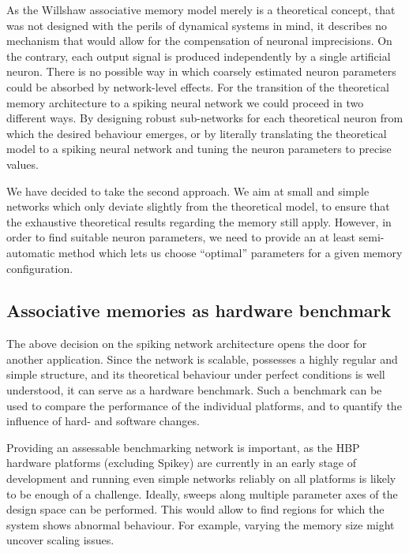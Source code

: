 As the Willshaw associative memory model merely is a theoretical concept, that was not designed with the perils of dynamical systems in mind, it describes no mechanism that would allow for the compensation of neuronal imprecisions. On the contrary, each output signal is produced independently by a single artificial neuron. There is no possible way in which coarsely estimated neuron parameters could be absorbed by network-level effects. For the transition of the theoretical memory architecture to a spiking neural network we could proceed in two different ways. By designing robust sub-networks for each theoretical neuron from which the desired behaviour emerges, or by literally translating the theoretical model to a spiking neural network and tuning the neuron parameters to precise values.

We have decided to take the second approach. We aim at small and simple networks which only deviate slightly from the theoretical model, to ensure that the exhaustive theoretical results regarding the memory still apply. However, in order to find suitable neuron parameters, we need to provide an at least semi-automatic method which lets us choose \enquote{optimal} parameters for a given memory configuration.

\subsection{Associative memories as hardware benchmark}

The above decision on the spiking network architecture opens the door for another application. Since the network is scalable, possesses a highly regular and simple structure, and its theoretical behaviour under perfect conditions is well understood, it can serve as a hardware benchmark. Such a benchmark can be used to compare the performance of the individual platforms, and to quantify the influence of hard- and software changes.

Providing an assessable benchmarking network is important, as the \acrshort{HBP} hardware platforms (excluding Spikey) are currently in an early stage of development and running even simple networks reliably on all platforms is likely to be enough of a challenge. Ideally, sweeps along multiple parameter axes of the design space can be performed. This would allow to find regions for which the system shows abnormal behaviour. For example, varying the memory size might uncover scaling issues.

